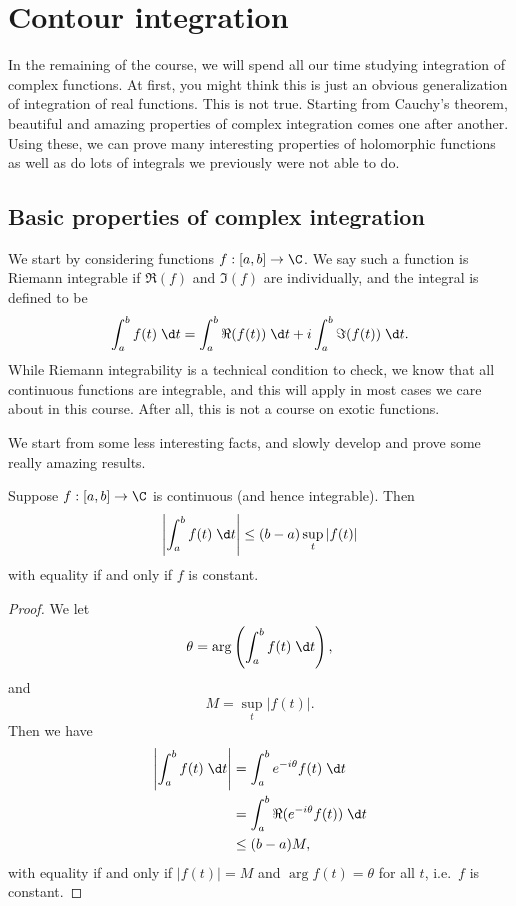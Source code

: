 \documentclass[a4paper]{article}
\begin{document}
\section{Contour integration}
In the remaining of the course, we will spend all our time studying integration of complex functions. At first, you might think this is just an obvious generalization of integration of real functions. This is not true. Starting from Cauchy's theorem, beautiful and amazing properties of complex integration comes one after another. Using these, we can prove many interesting properties of holomorphic functions as well as do lots of integrals we previously were not able to do.

\subsection{Basic properties of complex integration}
We start by considering functions $f: [a, b] \to \C$. We say such a function is Riemann integrable if $\Re(f)$ and $\Im (f)$ are individually, and the integral is defined to be
\[
  \int_a^b f(t) \;\d t = \int_a^b \Re(f(t))\;\d t + i \int_a^b \Im(f(t))\;\d t.
\]
While Riemann integrability is a technical condition to check, we know that all continuous functions are integrable, and this will apply in most cases we care about in this course. After all, this is not a course on exotic functions.

We start from some less interesting facts, and slowly develop and prove some really amazing results.
\begin{lemma}
  Suppose $f: [a, b] \to \C$ is continuous (and hence integrable). Then
  \[
    \left|\int_a^b f(t)\;\d t\right| \leq (b - a) \sup_t |f(t)|
  \]
  with equality if and only if $f$ is constant.
\end{lemma}

\begin{proof}
  We let
  \[
    \theta = \arg\left(\int_a^b f(t)\;\d t\right),
  \]
  and
  \[
    M = \sup_t |f(t)|.
  \]
  Then we have
  \begin{align*}
    \left|\int_a^b f(t)\;\d t\right| &= \int_a^b e^{-i\theta} f(t)\;\d t\\
    &= \int_a^b \Re(e^{-i\theta} f(t))\;\d t\\
    &\leq (b - a) M,
  \end{align*}
  with equality if and only if $|f(t)| =M$ and $\arg f(t) = \theta$ for all $t$, i.e.\ $f$ is constant.
\end{proof}
\end{document}
